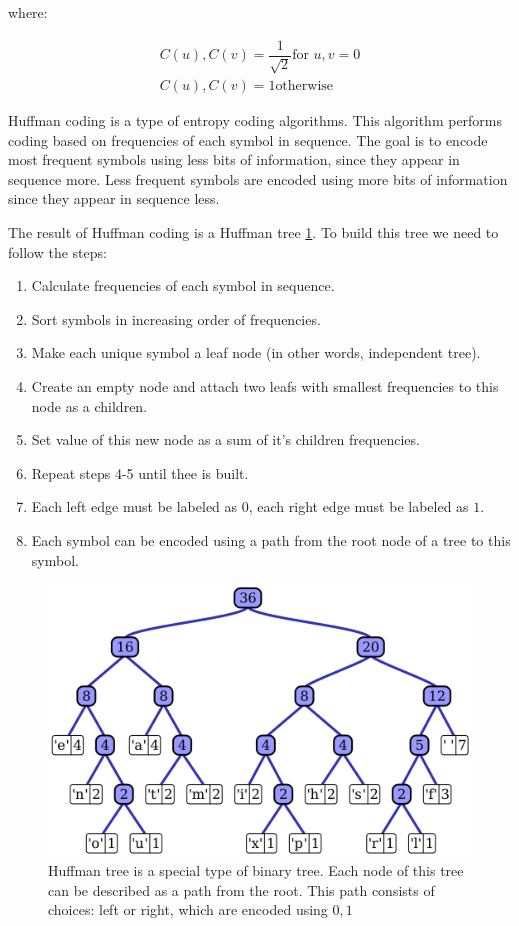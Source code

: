 where:

\begin{equation}
    \label{eq:02}
    \begin{split}
        C(u), C(v) = \dfrac{1}{\sqrt{2}} \text{for } u,v=0 \\
        C(u), C(v) = 1 \text{otherwise}
    \end{split}
\end{equation}

Huffman coding is a type of entropy coding algorithms. This algorithm performs coding based on frequencies of each symbol in sequence. The goal is to encode most frequent symbols using less bits of information, since they appear in sequence more. Less frequent symbols are encoded using more bits of information since they appear in sequence less.

The result of Huffman coding is a Huffman tree \ref{huffman-tree}. To build this tree we need to follow the steps:

\begin{enumerate}
    \item Calculate frequencies of each symbol in sequence.
    \item Sort symbols in increasing order of frequencies.
    \item Make each unique symbol a leaf node (in other words, independent tree).
    \item Create an empty node and attach two leafs with smallest frequencies to this node as a children.
    \item Set value of this new node as a sum of it's children frequencies.
    \item Repeat steps 4-5 until thee is built.
    \item Each left edge must be labeled as $0$, each right edge must be labeled as $1$.
    \item Each symbol can be encoded using a path from the root node of a tree to this symbol.
\end{enumerate}

\begin{figure}[!ht]
    \centering
    \includegraphics[width=\textwidth]{figure/Huffman_tree_2.svg.png}
    \caption{Huffman tree is a special type of binary tree. Each node of this tree can be described as a path from the root. This path consists of choices: left or right, which are encoded using ${0, 1}$}
    \label{huffman-tree}
\end{figure}

